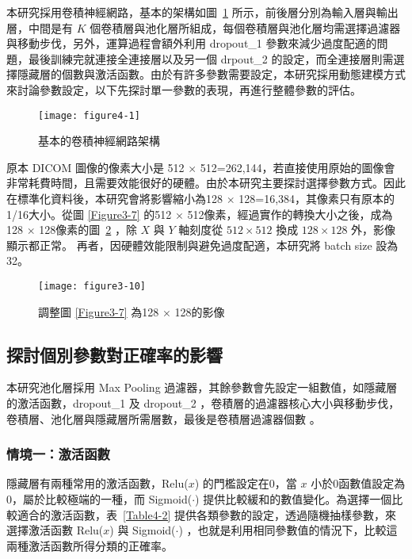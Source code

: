 \documentclass[12pt, a4paper]{article} 				%
\begin{document}
本研究採用卷積神經網路，基本的架構如圖~\ref{Figure4-1} 所示，前後層分別為輸入層與輸出層，中間是有 $K$ 個卷積層與池化層所組成，每個卷積層與池化層均需選擇過濾器與移動步伐，另外，運算過程會額外利用 dropout\_1 參數來減少過度配適的問題，最後訓練完就連接全連接層以及另一個 drpout\_2 的設定，而全連接層則需選擇隱藏層的個數與激活函數。由於有許多參數需要設定，本研究採用動態建模方式來討論參數設定，以下先探討單一參數的表現，再進行整體參數的評估。

\begin{figure}[!ht]
\begin{center}
\texttt{[image: figure4-1]}
\caption{基本的卷積神經網路架構}\label{Figure4-1}
\end{center}
\end{figure}

原本 DICOM 圖像的像素大小是 512 $\times$ 512=262,144，若直接使用原始的圖像會非常耗費時間，且需要效能很好的硬體。由於本研究主要探討選擇參數方式。因此在標準化資料後，本研究會將影響縮小為128 $\times$ 128=16,384，其像素只有原本的1/16大小。從圖 \ref{Figure3-7} 的512 $\times$ 512像素，經過實作的轉換大小之後，成為128 $\times$ 128像素的圖~\ref{Figure3-10} ，除 $X$ 與 $Y$ 軸刻度從 $512\times 512$ 換成 $128\times 128$ 外，影像顯示都正常。{\color{red}  再者，因硬體效能限制與避免過度配適，本研究將 batch size 設為 32。 }
\begin{figure}[!ht]
\begin{center}
\texttt{[image: figure3-10]}
\caption{調整圖 \ref{Figure3-7} 為128 $\times$ 128的影像}\label{Figure3-10}
\end{center}
\end{figure}

\subsection{探討個別參數對正確率的影響}
本研究池化層採用 Max Pooling 過濾器，其餘參數會先設定一組數值，如隱藏層的激活函數，dropout\_1 及 dropout\_2 ，卷積層的過濾器核心大小與移動步伐，卷積層、池化層與隱藏層所需層數，最後是卷積層過濾器個數 。

\subsubsection{情境一：激活函數}
隱藏層有兩種常用的激活函數，Relu($x$) 的門檻設定在0，當 $x$ 小於0函數值設定為0，屬於比較極端的一種，而 Sigmoid($\cdot$) 提供比較緩和的數值變化。為選擇一個比較適合的激活函數，表~\ref{Table4-2} 提供各類參數的設定，透過隨機抽樣參數，來選擇激活函數 Relu($x$) 與 Sigmoid($\cdot$) ，也就是利用相同參數值的情況下，比較這兩種激活函數所得分類的正確率。
\end{document}
